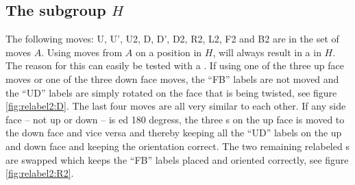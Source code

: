 \subsection{The subgroup $H$}
The following moves: U, U', U2, D, D', D2, R2, L2, F2 and B2 are in the set of moves $A$. Using moves from $A$ on a position in $H$, will always result in a \rubik{} in $H$. The reason for this can easily be tested with a \rubik{}. If using one of the three up face moves or one of the three down face moves, the ``FB'' labels are not moved and the ``UD'' labels are simply rotated on the face that is being twisted, see figure \ref{fig:relabel2:D}. The last four moves are all very similar to each other. If any side face -- not up or down -- is \twist{}ed 180 degress, the three \facelet{}s on the up face is moved to the down face and vice versa and thereby keeping all the ``UD'' labels on the up and down face and keeping the orientation correct. The two remaining relabeled \facelet{}s are swapped which keeps the ``FB'' labels placed and oriented correctly, see figure \ref{fig:relabel2:R2}.


\begin{figure}[!hb]
	\centering
	\hspace{0.05\textwidth}
	\caption{}
	\label{fig:relabel2}
\end{figure}
